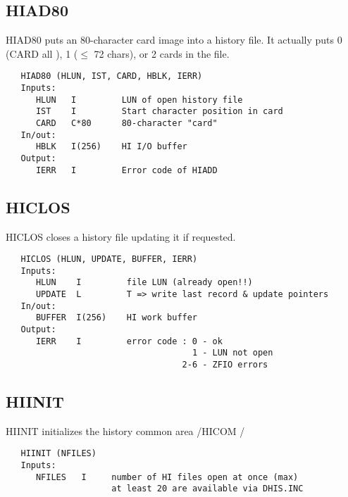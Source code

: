 \subsection{HIAD80}
HIAD80 puts an 80-character card image into a history file.  It
actually puts 0 (CARD all ), 1 ($\le$ 72 chars), or 2 cards in
the file.
\begin{verbatim}
   HIAD80 (HLUN, IST, CARD, HBLK, IERR)
   Inputs:
      HLUN   I         LUN of open history file
      IST    I         Start character position in card
      CARD   C*80      80-character "card"
   In/out:
      HBLK   I(256)    HI I/O buffer
   Output:
      IERR   I         Error code of HIADD
\end{verbatim}

\subsection{HICLOS}
HICLOS closes a history file updating it if requested.
\begin{verbatim}
   HICLOS (HLUN, UPDATE, BUFFER, IERR)
   Inputs:
      HLUN    I         file LUN (already open!!)
      UPDATE  L         T => write last record & update pointers
   In/out:
      BUFFER  I(256)    HI work buffer
   Output:
      IERR    I         error code : 0 - ok
                                     1 - LUN not open
                                   2-6 - ZFIO errors
\end{verbatim}

\subsection{HIINIT}
HIINIT initializes the history common area /HICOM /
\begin{verbatim}
   HIINIT (NFILES)
   Inputs:
      NFILES   I     number of HI files open at once (max)
                     at least 20 are available via DHIS.INC
\end{verbatim}

